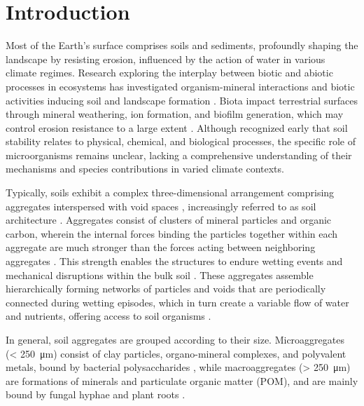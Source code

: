\section{Introduction}

Most of the Earth's surface comprises soils and sediments, profoundly shaping the landscape by resisting erosion, influenced by the action of water in various climate regimes. Research exploring the interplay between biotic and abiotic processes in ecosystems has investigated organism-mineral interactions \citep{Brehm2005, Quirk2012} and biotic activities inducing soil and landscape formation \citep{Dietrich2006}. Biota impact terrestrial surfaces through mineral weathering, ion formation, and biofilm generation, which may control erosion resistance to a large extent \citep{Gadd2010, Gorbushina2007, RiverasMunoz2022}. Although recognized early that soil stability relates to physical, chemical, and biological processes, the specific role of microorganisms remains unclear, lacking a comprehensive understanding of their mechanisms and species contributions in varied climate contexts.

Typically, soils exhibit a complex three-dimensional arrangement comprising aggregates interspersed with void spaces \citep{Bailey2013, Oades1991}, increasingly referred to as soil architecture \citep{Amelung2023}. Aggregates consist of clusters of mineral particles and organic carbon, wherein the internal forces binding the particles together within each aggregate are much stronger than the forces acting between neighboring aggregates \citep{Six2004}. This strength enables the structures to endure wetting events and mechanical disruptions within the bulk soil \citep{Bravo2018}. These aggregates assemble hierarchically forming networks of particles and voids that are periodically connected during wetting episodes, which in turn create a variable flow of water and nutrients, offering access to soil organisms \citep{Wilpiszeski2019}.

In general, soil aggregates are grouped according to their size. Microaggregates (\SI{< 250}{\micro\metre}) consist of clay particles, organo-mineral complexes, and polyvalent metals, bound by bacterial polysaccharides \citep{Six2004, Totsche2018}, while macroaggregates (\SI{> 250}{\micro\metre}) are formations of minerals and particulate organic matter (POM), and are mainly bound by fungal hyphae and plant roots \citep{Oades1984}.

